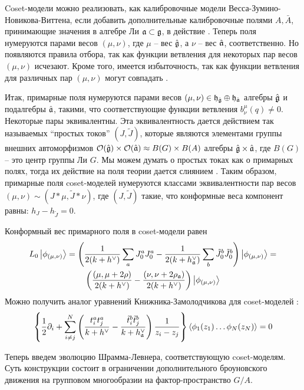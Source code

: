 Coset-модели можно реализовать, как калибровочные модели Весса-Зумино-Новикова-Виттена, если добавить дополнительные калибровочные полями  $A, \bar{A}$, принимающие значения в алгебре Ли $\mathfrak{a}\subset \mathfrak{g}$, в действие \cite{gawdzki1988g}. Теперь поля нумеруются парами весов  $(\mu,\nu)$, где $\mu$ -- вес  $\hat{\mathfrak{g}}$, а $\nu$ -- вес $\hat{\mathfrak{a}}$, соответственно. Но появляются правила отбора, так как функции ветвления для некоторых пар весов  $(\mu,\nu)$ исчезают. Кроме того, имеется избыточность, так как функции ветвления для различных пар $(\mu,\nu)$ могут совпадать \cite{fuchs1996resolution,schellekens1990field}.

Итак, примарные поля нумеруются парами весов  $(\mu,\nu)\in \mathfrak{h}_{\hat{\mathfrak{g}}}\oplus \mathfrak{h}_{\hat{\mathfrak{a}}}$ алгебры $\hat{\mathfrak{g}}$ и подалгебры $\hat{\mathfrak{a}}$, такими, что соответствующие функции ветвления $b^{\mu}_{\nu}(q)\neq 0$. Некоторые пары эквивалентны. Эта эквивалентность дается действием так называемых ``простых токов'' $(J,\tilde{J})$, которые являются элементами группы внешних автоморфизмов  $\mathcal{O}(\hat{\mathfrak{g}})\times \mathcal{O}(\hat{\mathfrak{a}})\approx B(G)\times B(A)$ алгебры $\hat{\mathfrak{g}}\times\hat{\mathfrak{a}}$, где $B(G)$ -- это центр группы Ли $G$. Мы можем думать о простых токах как о примарных полях, тогда их действие на поля теории дается слиянием \cite{difrancesco1997cft}. Таким образом, примарные поля coset-моделей нумеруются классами эквивалентности пар весов  $(\mu,\nu)\sim (J*\mu,\tilde{J}*\nu)$, где $(J,\tilde J)$ такие, что  конформные веса компонент равны:  $h_{J}-h_{\tilde{J}}=0$. 

Конформный вес примарного поля в coset-модели равен
\begin{multline}
  L_0\left|\phi_{(\mu,\nu)}\right>=\left(\frac{1}{2(k+h^{\vee})}\sum_aJ^a_0J^a_0-\frac{1}{2(k+h_{\mathfrak{a}}^{\vee})}\sum_b \tilde{J}^b_0 \tilde{J}^b_0 \right)
  \left|\phi_{(\mu,\nu)}\right>=\\
  \left(\frac{(\mu,\mu+2\rho)}{2(k+h^{\vee})}-\frac{(\nu,\nu+2\rho_{\mathfrak{a}})}{2(k+h^{\vee})}\right)\left|\phi_{(\mu,\nu)}\right>
\end{multline}
Можно получить аналог уравнений Книжника-Замолодчикова для coset-моделей \cite{kogan1997knizhnik}:
\begin{equation}
  \left\{\frac{1}{2}\partial_{i} + \sum_{i\neq j}^{N}\left(\frac{t^{a}_{i}t^{a}_{j}}{k+h^{\vee}}-\frac{\tilde t^{b}_{i}\tilde t^{b}_{j}}{k+h^{\vee}_{\mathfrak{a}}}\right)\frac{1}{z_{i}-z_{j}}\right\} \left<\phi_{1}(z_{1})\dots \phi_{N}(z_{N})\right>=0
  \label{eq:6}
\end{equation}

Теперь введем эволюцию Шрамма-Левнера, соответствующую coset-моделям. Суть конструкции состоит в ограничении дополнительного броуновского движения на групповом многообразии на фактор-пространство  $G/A$. 

